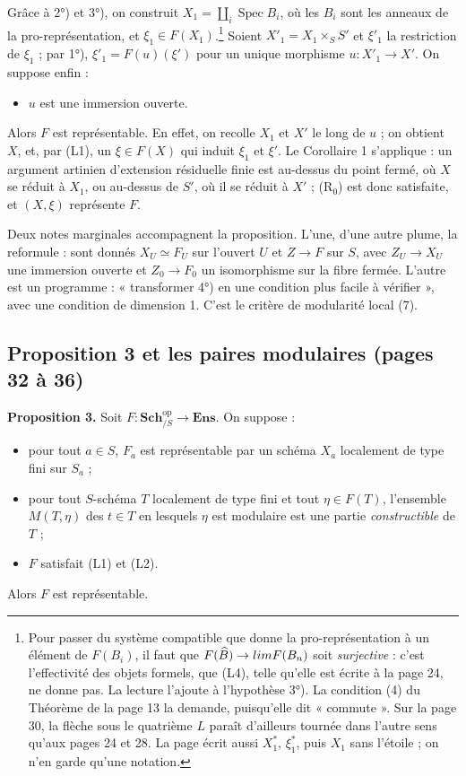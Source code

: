 \documentclass[11pt,a4paper]{article}
\begin{document}
Grâce à 2°) et 3°), on construit $X_1 = \coprod_i \operatorname{Spec} B_i$,
où les $B_i$ sont les anneaux de la pro-représentation, et $\xi_1 \in
F(X_1)$.\footnote{Pour passer du système compatible que donne la
pro-représentation à un élément de $F(B_i)$, il faut que $F(\widehat{B}) \to
\varprojlim F(B_n)$ soit \emph{surjective} : c'est l'effectivité des objets
formels, que (L4), telle qu'elle est écrite à la page 24, ne donne pas. La
lecture l'ajoute à l'hypothèse 3°). La condition (4) du Théorème de la page
13 la demande, puisqu'elle dit « commute ». Sur la page 30, la flèche sous le
quatrième $L$ paraît d'ailleurs tournée dans l'autre sens qu'aux pages 24 et
28. La page écrit aussi $X_1^{*}$, $\xi_1^{*}$, puis $X_1$ sans l'étoile ; on
n'en garde qu'une notation.} Soient $X'_1 = X_1 \times_S S'$ et $\xi'_1$ la
restriction de $\xi_1$ ; par 1°), $\xi'_1 = F(u)(\xi')$ pour un unique
morphisme $u : X'_1 \to X'$. On suppose enfin :
\begin{itemize}
\item[4°)] $u$ est une immersion ouverte.
\end{itemize}
Alors $F$ est représentable. En effet, on recolle $X_1$ et $X'$ le long de
$u$ ; on obtient $X$, et, par (L1), un $\xi \in F(X)$ qui induit $\xi_1$ et
$\xi'$. Le Corollaire 1 s'applique : un argument artinien d'extension
résiduelle finie est au-dessus du point fermé, où $X$ se réduit à $X_1$, ou
au-dessus de $S'$, où il se réduit à $X'$ ; (R$_0$) est donc satisfaite, et
$(X, \xi)$ représente $F$.

Deux notes marginales accompagnent la proposition. L'une, d'une autre plume,
la reformule : sont donnés $X_U \simeq F_U$ sur l'ouvert $U$ et $Z \to F$ sur
$S$, avec $Z_U \to X_U$ une immersion ouverte et $Z_0 \to F_0$ un
isomorphisme sur la fibre fermée. L'autre est un programme : « transformer
4°) en une condition plus facile à vérifier », avec une condition de
dimension 1. C'est le critère de modularité local (7).

\subsection*{Proposition 3 et les paires modulaires (pages 32 à 36)}

\textbf{Proposition 3.} Soit $F : \mathbf{Sch}_{/S}^{\mathrm{op}} \to
\mathbf{Ens}$. On suppose :
\begin{itemize}
\item[1°)] pour tout $a \in S$, $F_a$ est représentable par un schéma $X_a$
localement de type fini sur $S_a$ ;
\item[2°)] pour tout $S$-schéma $T$ localement de type fini et tout $\eta \in
F(T)$, l'ensemble $M(T, \eta)$ des $t \in T$ en lesquels $\eta$ est modulaire
est une partie \emph{constructible} de $T$ ;
\item[3°)] $F$ satisfait (L1) et (L2).
\end{itemize}
Alors $F$ est représentable.
\end{document}
